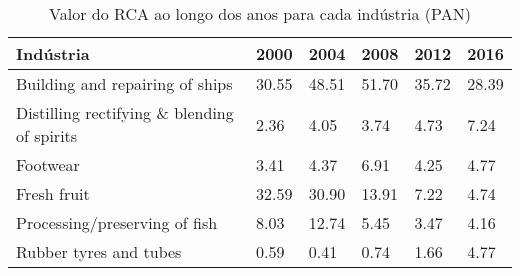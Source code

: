 \begin{table}
\centering
\caption{Valor do RCA ao longo dos anos para cada indústria (PAN)}
\begin{tabular}{p{6cm}p{1.5cm}p{1.5cm}p{1.5cm}p{1.5cm}p{1.5cm}}
\toprule
                                  Indústria &  2000 &  2004 &  2008 &  2012 &  2016 \\
\midrule
            Building and repairing of ships & 30.55 & 48.51 & 51.70 & 35.72 & 28.39 \\
Distilling rectifying \& blending of spirits &  2.36 &  4.05 &  3.74 &  4.73 &  7.24 \\
                                   Footwear &  3.41 &  4.37 &  6.91 &  4.25 &  4.77 \\
                                Fresh fruit & 32.59 & 30.90 & 13.91 &  7.22 &  4.74 \\
              Processing/preserving of fish &  8.03 & 12.74 &  5.45 &  3.47 &  4.16 \\
                     Rubber tyres and tubes &  0.59 &  0.41 &  0.74 &  1.66 &  4.77 \\
\bottomrule
\end{tabular}
\end{table}
